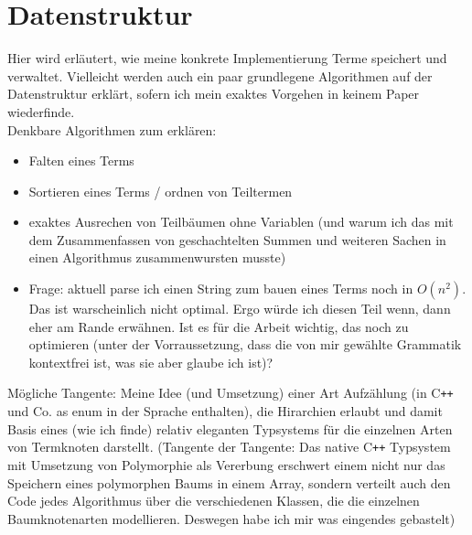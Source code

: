 \documentclass{article}
\begin{document}
\section{Datenstruktur}

Hier wird erläutert, wie meine konkrete Implementierung Terme speichert und verwaltet. Vielleicht werden auch ein paar grundlegene Algorithmen auf der Datenstruktur erklärt, sofern ich mein exaktes Vorgehen in keinem Paper wiederfinde.\\
Denkbare Algorithmen zum erklären:
\begin{itemize}
    \item Falten eines Terms
    \item Sortieren eines Terms / ordnen von Teiltermen
    \item exaktes Ausrechen von Teilbäumen ohne Variablen (und warum ich das mit dem Zusammenfassen von geschachtelten Summen und weiteren Sachen in einen Algorithmus zusammenwursten musste)
    \item Frage: aktuell parse ich einen String zum bauen eines Terms noch in $O(n^2)$. Das ist warscheinlich nicht optimal. Ergo würde ich diesen Teil wenn, dann eher am Rande erwähnen. Ist es für die Arbeit wichtig, das noch zu optimieren (unter der Vorraussetzung, dass die von mir gewählte Grammatik kontextfrei ist, was sie aber glaube ich ist)?
\end{itemize}

Mögliche Tangente: Meine Idee (und Umsetzung) einer Art Aufzählung (in C\texttt{++} und Co. as enum in der Sprache enthalten), die Hirarchien erlaubt und damit Basis eines (wie ich finde) relativ eleganten Typsystems für die einzelnen Arten von Termknoten darstellt. (Tangente der Tangente: Das native C\texttt{++} Typsystem mit Umsetzung von Polymorphie als Vererbung erschwert einem nicht nur das Speichern eines polymorphen Baums in einem Array, sondern verteilt auch den Code jedes Algorithmus über die verschiedenen Klassen, die die einzelnen Baumknotenarten modellieren. Deswegen habe ich mir was eingendes gebastelt)
~\\~
\end{document}

